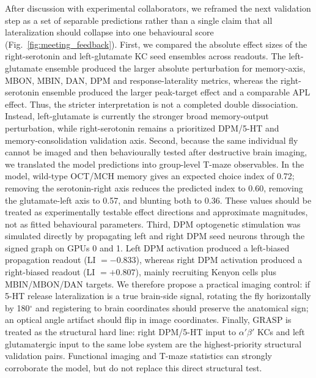 \documentclass[10pt]{article}
\begin{document}
After discussion with experimental collaborators, we reframed the next validation step as a set of separable predictions rather than a single claim that all lateralization should collapse into one behavioural score (Fig.~\ref{fig:meeting_feedback}). First, we compared the absolute effect sizes of the right-serotonin and left-glutamate KC seed ensembles across readouts. The left-glutamate ensemble produced the larger absolute perturbation for memory-axis, MBON, MBIN, DAN, DPM and response-laterality metrics, whereas the right-serotonin ensemble produced the larger peak-target effect and a comparable APL effect. Thus, the stricter interpretation is not a completed double dissociation. Instead, left-glutamate is currently the stronger broad memory-output perturbation, while right-serotonin remains a prioritized DPM/5-HT and memory-consolidation validation axis. Second, because the same individual fly cannot be imaged and then behaviourally tested after destructive brain imaging, we translated the model predictions into group-level T-maze observables. In the model, wild-type OCT/MCH memory gives an expected choice index of 0.72; removing the serotonin-right axis reduces the predicted index to 0.60, removing the glutamate-left axis to 0.57, and blunting both to 0.36. These values should be treated as experimentally testable effect directions and approximate magnitudes, not as fitted behavioural parameters. Third, DPM optogenetic stimulation was simulated directly by propagating left and right DPM seed neurons through the signed graph on GPUs 0 and 1. Left DPM activation produced a left-biased propagation readout (LI $=-0.833$), whereas right DPM activation produced a right-biased readout (LI $=+0.807$), mainly recruiting Kenyon cells plus MBIN/MBON/DAN targets. We therefore propose a practical imaging control: if 5-HT release lateralization is a true brain-side signal, rotating the fly horizontally by 180$^\circ$ and registering to brain coordinates should preserve the anatomical sign; an optical angle artifact should flip in image coordinates. Finally, GRASP is treated as the structural hard line: right DPM/5-HT input to $\alpha'\beta'$ KCs and left glutamatergic input to the same lobe system are the highest-priority structural validation pairs. Functional imaging and T-maze statistics can strongly corroborate the model, but do not replace this direct structural test.
\end{document}
